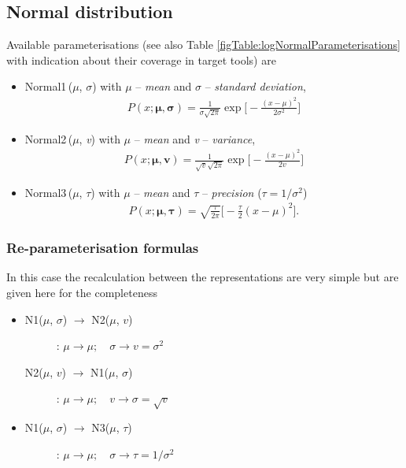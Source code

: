 {\subsection{Normal distribution}
Available parameterisations (see also Table \ref{figTable:logNormalParameterisations} 
with indication about their coverage in target tools) are
\begin{itemize}
\item
Normal1\,($\mu$, $\sigma$) with $\mu$ -- \emph{mean} and $\sigma$ -- \emph{standard deviation}, 
\begin{align*}
P(x;\boldsymbol\mu,\boldsymbol\sigma)= \frac{1}{\sigma \sqrt{2 \pi}}\exp\Big[-\frac{(x-\mu)^2}{2\sigma^2}\Big]
\end{align*}
\item
Normal2\,($\mu$, \emph{v}) with $\mu$ -- \emph{mean} and \emph{v} -- \emph{variance},
\begin{align*}
P(x;\boldsymbol\mu,\boldsymbol v)= \frac{1}{\sqrt{v} \sqrt{2 \pi}}\exp\Big[-\frac{(x-\mu)^2}{2v}\Big]
\end{align*}
\item
Normal3\,($\mu$, $\tau$) with $\mu$ -- \emph{mean} and $\tau$ -- \emph{precision} ($\tau=1/\sigma^2$)
\begin{align*}
P(x;\boldsymbol\mu,\boldsymbol\tau)= \sqrt{\frac{\tau}{2 \pi}} \Big[-\frac{\tau}{2}(x-\mu)^2\Big].
\end{align*}
\end{itemize}

\subsubsection{Re-parameterisation formulas}
In this case the recalculation between the representations are very simple
but are given here for the completeness
\begin{itemize}
\item 
\begin{description}
\item[N1($\mu$, $\sigma$) $\rightarrow$ N2($\mu$, $v$)]:
$\mu \rightarrow \mu; \quad \sigma \rightarrow v=\sigma^2$

\item[N2($\mu$, $v$) $\rightarrow$ N1($\mu$, $\sigma$)]:
$\mu \rightarrow \mu; \quad v \rightarrow \sigma = \sqrt{v}$
\end{description}

\item 
\begin{description}
\item[N1($\mu$, $\sigma$) $\rightarrow$ N3($\mu$, $\tau$)]:
$\mu \rightarrow \mu; \quad \sigma \rightarrow \tau=1/\sigma^2$


\end{description}
\end{itemize}}

